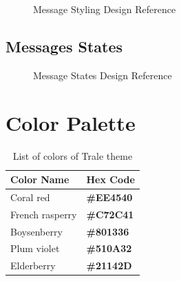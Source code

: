 \begin{figure}[ht]
    \caption{Message Styling Design Reference}
    \centering\def\svgwidth{15cm}\label{fig:figure2}
\end{figure}


\subsection{Messages States}\label{subsec:messages-states}
\begin{figure}[ht]
    \caption{Message States Design Reference}
    \centering\def\svgwidth{15cm}\label{fig:figure3}
\end{figure}

\section{Color Palette}\label{sec:color-palette}

\begin{table}[hb]
    \centering
    \begin{tabular}{|l|l|}
        \hline
        \textbf{Color Name} & \textbf{Hex Code}\\ \hline
        Coral red & \color[HTML]{EE4540}\textbf{\#EE4540} \\ \hline
        French rasperry & \color[HTML]{C72C41}\textbf{\#C72C41} \\ \hline
        Boysenberry & \color[HTML]{801336}\textbf{\#801336} \\ \hline
        Plum violet & \color[HTML]{510A32}\textbf{\#510A32} \\ \hline
        Elderberry & \color[HTML]{21142D}\textbf{\#21142D} \\ \hline
    \end{tabular}
    \caption{List of colors of Trale theme}
    \label{tab:colorTable}
\end{table}

